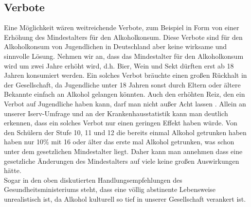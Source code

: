 \documentclass[12pt]{article}
\begin{document}
\subsection{Verbote}
Eine Möglichkeit wären weitreichende Verbote, zum Beispiel in Form von einer Erhöhung des Mindestalters für den Alkoholkonsum. Diese Verbote sind für den Alkoholkonsum von Jugendlichen in Deutschland aber keine wirksame und sinnvolle Lösung. Nehmen wir an, dass das Mindestalter für den Alkoholkonsum wird um zwei Jahre erhöht wird, d.h. Bier, Wein und Sekt dürften erst ab 18 Jahren konsumiert werden. Ein solches Verbot bräuchte einen großen Rückhalt in der Gesellschaft, da Jugendliche unter 18 Jahren sonst durch Eltern oder ältere Bekannte einfach an Alkohol gelangen könnten. Auch den erhöhten Reiz, den ein Verbot auf Jugendliche haben kann, darf man nicht außer Acht lassen \autocite[169]{skala_jugend_2020}. 
Allein an unserer Iserv-Umfrage und an der Krankenhausstatistik kann man deutlich erkennen, dass ein solches Verbot nur einen geringen Effekt haben würde. Von den Schülern der Stufe 10, 11 und 12 die bereits einmal Alkohol getrunken haben haben nur 10\% mit 16 oder älter das erste mal Alkohol getrunken, was schon unter dem gesetzlichen Mindestalter liegt. Daher kann man annehmen dass eine gesetzliche Änderungen des Mindestalters auf viele keine großen Auswirkungen hätte.\\
Sogar in den oben diskutierten Handlungsempfehlungen des Gesundheitsministeriums steht, dass eine völlig abstinente Lebensweise unrealistisch ist, da Alkohol kulturell so tief in unserer Gesellschaft verankert ist.\autocite[24]{kuhn_empfehlungen_nodate}
\end{document}
